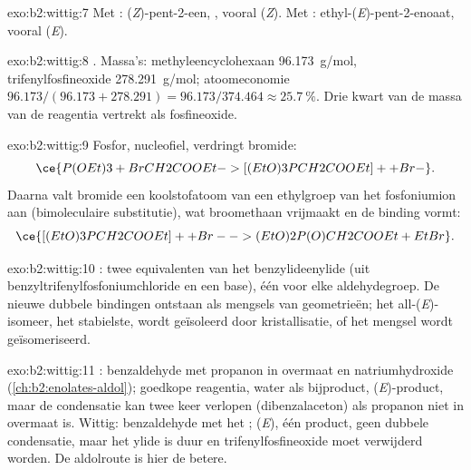 \begin{solution}{exo:b2:wittig:7}
Met : (\textit{Z})-pent-2-een, , vooral (\textit{Z}). Met
: ethyl-(\textit{E})-pent-2-enoaat, vooral (\textit{E}).
\end{solution}

\begin{solution}{exo:b2:wittig:8}
. Massa's: methyleencyclohexaan \qty{96.173}{g/mol},
trifenylfosfineoxide \qty{278.291}{g/mol}; atoomeconomie $96.173/(96.173 + 278.291) =
96.173/374.464 \approx 25.7~\%$. Drie kwart van de massa van de reagentia vertrekt als fosfineoxide.
\end{solution}

\begin{solution}{exo:b2:wittig:9}
Fosfor, nucleofiel, verdringt bromide:
\begin{equation*}
\ce{P(OEt)3 + BrCH2COOEt -> [(EtO)3PCH2COOEt]+ + Br-}.
\end{equation*}
Daarna
valt bromide een koolstofatoom van een ethylgroep van het fosfoniumion aan (bimoleculaire substitutie), wat
broomethaan vrijmaakt en de binding  vormt:
\begin{equation*}
\ce{[(EtO)3PCH2COOEt]+ + Br- -> (EtO)2P(O)CH2COOEt + EtBr}.
\end{equation*}
\end{solution}

\begin{solution}{exo:b2:wittig:10}
: twee equivalenten van het
benzylideenylide (uit benzyltrifenylfosfoniumchloride en een base), één voor elke aldehydegroep.
De nieuwe dubbele bindingen ontstaan als mengsels van geometrieën; het all-(\textit{E})-isomeer, het
stabielste, wordt geïsoleerd door kristallisatie, of het mengsel wordt geïsomeriseerd.
\end{solution}

\begin{solution}{exo:b2:wittig:11}
: benzaldehyde met propanon in overmaat en natriumhydroxide (\cref{ch:b2:enolates-aldol});
goedkope reagentia, water als bijproduct, (\textit{E})-product, maar de condensatie kan twee keer verlopen
(dibenzalaceton) als propanon niet in overmaat is. Wittig: benzaldehyde met het 
; (\textit{E}), één product, geen dubbele condensatie, maar het ylide is duur en
trifenylfosfineoxide moet verwijderd worden. De aldolroute is hier de betere.
\end{solution}

